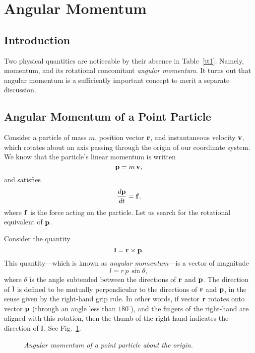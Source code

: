 \section{Angular Momentum}\label{sangm}
\subsection{Introduction}
Two physical quantities are noticeable by their absence in Table~\ref{tt1}. Namely,
momentum, and its rotational concomitant {\em angular momentum}. It turns
out that angular momentum is a sufficiently important concept to merit a separate discussion.

\subsection{Angular Momentum of a Point Particle}\label{sang}
Consider a particle of mass $m$, position vector ${\bf r}$, and instantaneous velocity ${\bf v}$,
which rotates about an axis 
 passing through the origin of our coordinate system. We know that the
particle's linear momentum  is written
\begin{equation}
{\bf p} = m\,{\bf v},
\end{equation}
and satisfies
\begin{equation}\label{e90}
\frac{d{\bf p}}{dt} = {\bf f},
\end{equation}
where ${\bf f}$ is the force acting on the particle. Let us search for the rotational
equivalent of ${\bf p}$. 

Consider the quantity
\begin{equation}\label{e91}
{\bf l} = {\bf r}\times {\bf p}.
\end{equation}
This quantity---which is known as {\em angular momentum}---is a vector of magnitude
\begin{equation}
l = r\,p\,\sin\theta,
\end{equation}
where $\theta$ is the angle subtended between the directions of ${\bf r}$ and ${\bf p}$. 
The direction of ${\bf l}$ is defined to be mutually perpendicular to the directions
of ${\bf r}$ and ${\bf p}$, in the sense given by the right-hand grip rule. In other
words, if vector ${\bf r}$ rotates onto vector ${\bf p}$ (through an angle less
than $180^\circ$), and the fingers of the right-hand are aligned with this rotation, then
the thumb of the right-hand indicates the direction of ${\bf l}$. See Fig.~\ref{f86}.

\begin{figure}
\epsfysize=2.5in
\centerline{}
\caption{\em Angular momentum of a point particle about the origin.}\label{f86}  
\end{figure}

